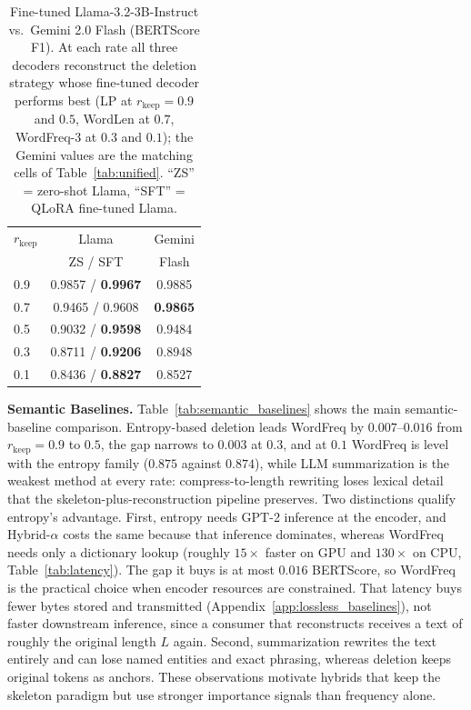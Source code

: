 \documentclass[11pt]{article}
\newcommand{\rkeep}{r_{\mathrm{keep}}}
\begin{document}
\begin{table}[t]
\centering
\small
\setlength{\tabcolsep}{4pt}
\caption{Fine-tuned Llama-3.2-3B-Instruct vs.\ Gemini 2.0 Flash (BERTScore F1). At each rate all three
decoders reconstruct the deletion strategy whose fine-tuned decoder performs best (LP at $\rkeep = 0.9$ and
$0.5$, WordLen at $0.7$, WordFreq-3 at $0.3$ and $0.1$); the Gemini values are the matching cells of
Table~\ref{tab:unified}. ``ZS'' = zero-shot Llama, ``SFT'' = QLoRA fine-tuned Llama.}
\label{tab:finetune}
\begin{tabular}{lcc}
\toprule
$\rkeep$ & Llama & Gemini \\
 & ZS / SFT & Flash \\
\midrule
0.9 & 0.9857 / \textbf{0.9967} & 0.9885 \\
0.7 & 0.9465 / 0.9608 & \textbf{0.9865} \\
0.5 & 0.9032 / \textbf{0.9598} & 0.9484 \\
0.3 & 0.8711 / \textbf{0.9206} & 0.8948 \\
0.1 & 0.8436 / \textbf{0.8827} & 0.8527 \\
\bottomrule
\end{tabular}
\end{table}

\textbf{Semantic Baselines.}\label{sec:new_baselines}
Table~\ref{tab:semantic_baselines} shows the main semantic-baseline comparison. Entropy-based deletion leads WordFreq by $0.007$--$0.016$ from $\rkeep = 0.9$ to $0.5$, the gap narrows to $0.003$ at $0.3$, and at $0.1$ WordFreq is level with the entropy family ($0.875$ against $0.874$), while LLM summarization is the weakest method at every rate: compress-to-length rewriting loses lexical detail that the skeleton-plus-reconstruction pipeline preserves. Two distinctions qualify entropy's advantage. First, entropy needs GPT-2 inference at the encoder, and Hybrid-$\alpha$ costs the same because that inference dominates, whereas WordFreq needs only a dictionary lookup (roughly $15\times$ faster on GPU and $130\times$ on CPU, Table~\ref{tab:latency}). The gap it buys is at most $0.016$ BERTScore, so WordFreq is the practical choice when encoder resources are constrained. That latency buys fewer bytes stored and transmitted (Appendix~\ref{app:lossless_baselines}), not faster downstream inference, since a consumer that reconstructs receives a text of roughly the original length $L$ again. Second, summarization rewrites the text entirely and can lose named entities and exact phrasing, whereas deletion keeps original tokens as anchors. These observations motivate hybrids that keep the skeleton paradigm but use stronger importance signals than frequency alone.
\end{document}
